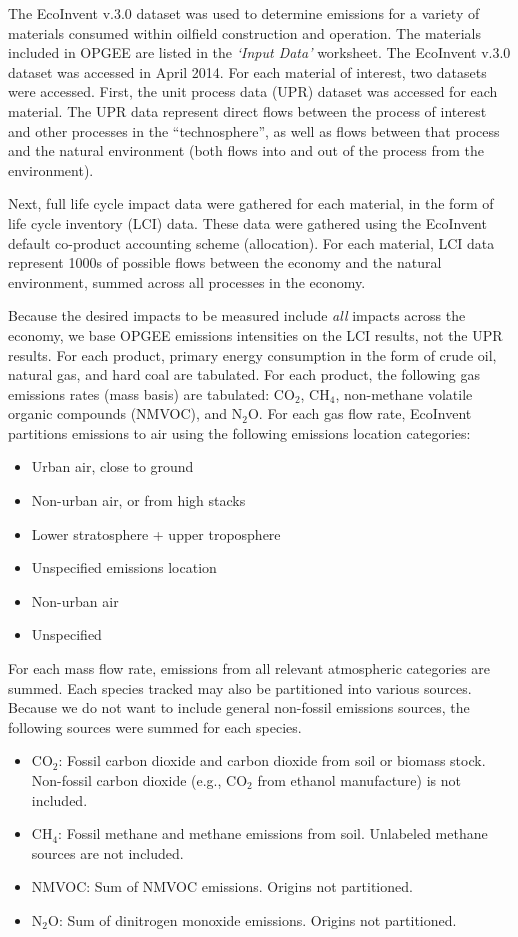 \documentclass[11pt]{report}
\newcommand{\sheet}[1]{\textit{`{#1}'}}
\begin{document}
The EcoInvent v.3.0 dataset was used to determine emissions for a variety of materials consumed within oilfield construction and operation. The materials included in OPGEE are listed in the \sheet{Input Data} worksheet. The EcoInvent v.3.0 dataset was accessed in April 2014. For each material of interest, two datasets were accessed. First, the unit process data (UPR) dataset was accessed for each material. The UPR data represent direct flows between the process of interest and other processes in the ``technosphere'', as well as flows between that process and the natural environment (both flows into and out of the process from the environment).

Next, full life cycle impact data were gathered for each material, in the form of life cycle inventory (LCI) data. These data were gathered using the EcoInvent default co-product accounting scheme (allocation). For each material, LCI data represent 1000s of possible flows between the economy and the natural environment, summed across all processes in the economy. 

Because the desired impacts to be measured include \emph{all} impacts across the economy, we base OPGEE emissions intensities on the LCI results, not the UPR results. For each product, primary energy consumption in the form of crude oil, natural gas, and hard coal are tabulated. For each product, the following gas emissions rates (mass basis) are tabulated: CO$_2$, CH$_4$, non-methane volatile organic compounds (NMVOC), and N$_2$O. For each gas flow rate, EcoInvent partitions emissions to air using the following emissions location categories:
\begin{itemize}
\item Urban air, close to ground
\item Non-urban air, or from high stacks
\item Lower stratosphere + upper troposphere
\item Unspecified emissions location
\item Non-urban air
\item Unspecified
\end{itemize}

For each mass flow rate, emissions from all relevant atmospheric categories are summed. Each species tracked may also be partitioned into various sources. Because we do not want to include general non-fossil emissions sources, the following sources were summed for each species.
\begin{itemize}
\item CO$_2$: Fossil carbon dioxide and carbon dioxide from soil or biomass stock. Non-fossil carbon dioxide (e.g., CO$_2$ from ethanol manufacture) is not included.
\item CH$_4$: Fossil methane and methane emissions from soil. Unlabeled methane sources are not included.
\item NMVOC: Sum of NMVOC emissions. Origins not partitioned.
\item N$_2$O: Sum of dinitrogen monoxide emissions. Origins not partitioned.
\end{itemize}
\end{document}
